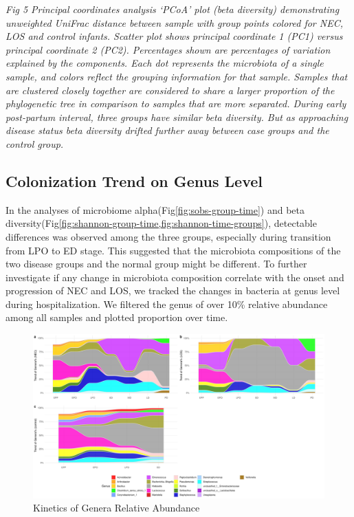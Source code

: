 \documentclass[fleqn,10pt]{wlpeerj} %
\begin{document}
    \emph{Fig 5 Principal coordinates analysis ‘PCoA’ plot (beta diversity) demonstrating unweighted UniFrac distance between sample with group points colored for NEC, LOS and control infants. Scatter plot shows principal coordinate 1 (PC1) versus principal coordinate 2 (PC2). Percentages shown are percentages of variation explained by the components. Each dot represents the microbiota of a single sample, and colors reflect the grouping information for that sample. Samples that are clustered closely together are considered to share a larger proportion of the phylogenetic tree in comparison to samples that are more separated. During early post-partum interval, three groups have similar beta diversity. But as approaching disease status beta diversity drifted further away between case groups and the control group.}

  \subsection*{Colonization Trend on Genus Level}
  In the analyses of microbiome alpha(Fig\ref{fig:sobs-group-time}) and beta diversity(Fig\ref{fig:shannon-group-time,fig:shannon-time-groups}), detectable differences was observed among the three groups, especially during transition from LPO to ED stage.  This suggested that the microbiota compositions of the two disease groups and the normal group might be different.  To further investigate if any change in microbiota composition correlate with the onset and progression of NEC and LOS, we tracked the changes in bacteria at genus level during hospitalization.  We filtered the genus of over 10\% relative abundance among all samples and plotted proportion over time.
  \begin{figure}[ht]\centering
    \includegraphics[width=\linewidth]{figure/taxa-time.pdf}
    \caption{Kinetics of Genera Relative Abundance}
    \label{fig:taxa-time}
  \end{figure}
\end{document}
